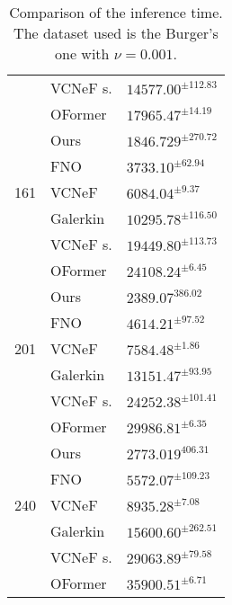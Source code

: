 \begin{table}[]
\begin{tabular}{|l|l|l|}
                                      & VCNeF s. & $14577.00^{\pm 112.83}$                    \\ \cline{2-3} 
\multicolumn{1}{|l|}{}                & OFormer  & $17965.47^{\pm 14.19}$                  \\ \hline
                                      & Ours     & $1846.729^{\pm 270.72}$                            \\ \cline{2-3} 
                                      & FNO      & $3733.10^{\pm 62.94}$                     \\ \cline{2-3} 
\multicolumn{1}{|c|}{161}               & VCNeF    & $6084.04^{\pm 9.37}$                    \\ \cline{2-3} 
                                      & Galerkin & $10295.78^{\pm 116.50}$                    \\ \cline{2-3} 
                                      & VCNeF s. & $19449.80^{\pm 113.73}$                  \\ \cline{2-3} 
\multicolumn{1}{|l|}{}                & OFormer  & $24108.24^{\pm 6.45}$                 \\ \hline
                                      & Ours     & $2389.07^{386.02}$                           \\ \cline{2-3} 
                                      & FNO      & $4614.21^{\pm 97.52}$                    \\ \cline{2-3} 
\multicolumn{1}{|c|}{201}               & VCNeF    & $7584.48^{\pm 1.86}$                  \\ \cline{2-3} 
                                      & Galerkin & $13151.47^{\pm 93.95}$                   \\ \cline{2-3} 
                                      & VCNeF s. & $24252.38^{\pm 101.41}$                   \\ \cline{2-3} 
\multicolumn{1}{|l|}{}                & OFormer  & $29986.81^{\pm 6.35}$                   \\ \hline
                                      & Ours     & $2773.019^{406.31}$                          \\ \cline{2-3} 
                                      & FNO      & $5572.07^{\pm 109.23}$                     \\ \cline{2-3} 
\multicolumn{1}{|c|}{240}               & VCNeF    & $8935.28^{\pm 7.08}$                  \\ \cline{2-3} 
                                      & Galerkin & $15600.60^{\pm 262.51}$                     \\ \cline{2-3} 
                                      & VCNeF s. & $29063.89^{\pm 79.58}$                 \\ \cline{2-3} 
\multicolumn{1}{|l|}{}                & OFormer  & $35900.51^{\pm 6.71}$                 \\ \hline
\end{tabular}
\caption{Comparison of the inference time. The dataset used is the Burger's one with $\nu=0.001$.}
\label{tab:inference_time}
\end{table}

